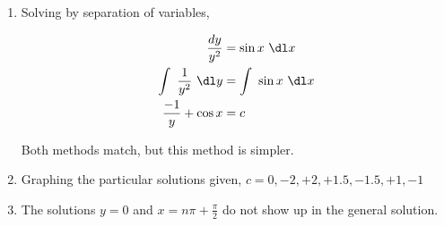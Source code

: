 \begin{enumerate}
\begin{enumerate}
              \item Solving by separation of variables,

                    \begin{align}
                        \frac{dy}{y^{2}}             & = \sin x\ \dl x       \\
                        \int\ \frac{1}{y^{2}}\ \dl y & = \int\ \sin x\ \dl x \\
                        \frac{-1}{y} + \cos x        & = c
                    \end{align}

                    Both methods match, but this method is simpler.

              \item Graphing the particular solutions given, $ c = 0, -2, +2, +1.5, -1.5, +1, -1 $
                    \begin{figure}[H]
                        \centering
                    \end{figure}

              \item The solutions $ y = 0 $ and $ x = n\pi+ \frac{\pi}{2}$ do not show up in
                    the general solution.
          \end{enumerate}
\end{enumerate}